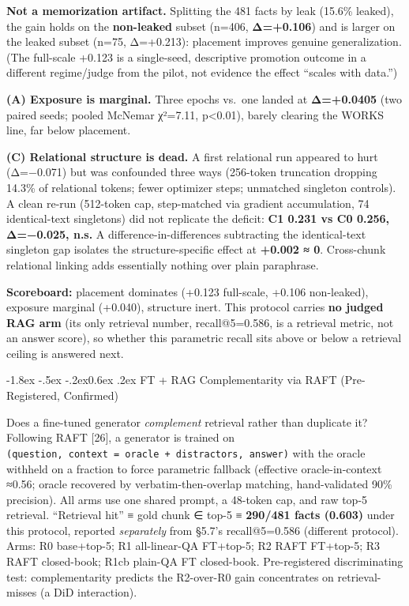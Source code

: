 \documentclass[10pt,twocolumn]{article}
\makeatletter
\renewcommand\subsection{\@startsection{subsection}{2}{\z@}%
  {-1.8ex \@plus -.5ex \@minus -.2ex}{0.6ex \@plus .2ex}%
  {\normalfont\normalsize\bfseries}}
\makeatother
\begin{document}
\textbf{Not a memorization artifact.} Splitting the 481 facts by leak (15.6\% leaked), the gain holds on the \textbf{non-leaked} subset (n=406, \textbf{Δ=+0.106}) and is larger on the leaked subset (n=75, Δ=+0.213): placement improves genuine generalization. (The full-scale +0.123 is a single-seed, descriptive promotion outcome in a different regime/judge from the pilot, not evidence the effect ``scales with data.'')

\textbf{(A) Exposure is marginal.} Three epochs vs.~one landed at \textbf{Δ=+0.0405} (two paired seeds; pooled McNemar χ²=7.11, p\textless0.01), barely clearing the WORKS line, far below placement.

\textbf{(C) Relational structure is dead.} A first relational run appeared to hurt (Δ=−0.071) but was confounded three ways (256-token truncation dropping 14.3\% of relational tokens; fewer optimizer steps; unmatched singleton controls). A clean re-run (512-token cap, step-matched via gradient accumulation, 74 identical-text singletons) did not replicate the deficit: \textbf{C1 0.231 vs C0 0.256, Δ=−0.025, n.s.} A difference-in-differences subtracting the identical-text singleton gap isolates the structure-specific effect at \textbf{+0.002 ≈ 0}. Cross-chunk relational linking adds essentially nothing over plain paraphrase.

\textbf{Scoreboard:} placement dominates (+0.123 full-scale, +0.106 non-leaked), exposure marginal (+0.040), structure inert. This protocol carries \textbf{no judged RAG arm} (its only retrieval number, recall@5=0.586, is a retrieval metric, not an answer score), so whether this parametric recall sits above or below a retrieval ceiling is answered next.

\hypertarget{ft-rag-complementarity-via-raft-pre-registered-confirmed}{%
\subsection{FT + RAG Complementarity via RAFT (Pre-Registered, Confirmed)}\label{ft-rag-complementarity-via-raft-pre-registered-confirmed}}

Does a fine-tuned generator \emph{complement} retrieval rather than duplicate it? Following RAFT {[}26{]}, a generator is trained on \texttt{(question,\ context\ =\ oracle\ +\ distractors,\ answer)} with the oracle withheld on a fraction to force parametric fallback (effective oracle-in-context ≈0.56; oracle recovered by verbatim-then-overlap matching, hand-validated 90\% precision). All arms use one shared prompt, a 48-token cap, and raw top-5 retrieval. ``Retrieval hit'' ≡ gold chunk ∈ top-5 ≡ \textbf{290/481 facts (0.603)} under this protocol, reported \emph{separately} from §5.7's recall@5=0.586 (different protocol). Arms: R0 base+top-5; R1 all-linear-QA FT+top-5; R2 RAFT FT+top-5; R3 RAFT closed-book; R1cb plain-QA FT closed-book. Pre-registered discriminating test: complementarity predicts the R2-over-R0 gain concentrates on retrieval-misses (a DiD interaction).
\end{document}
